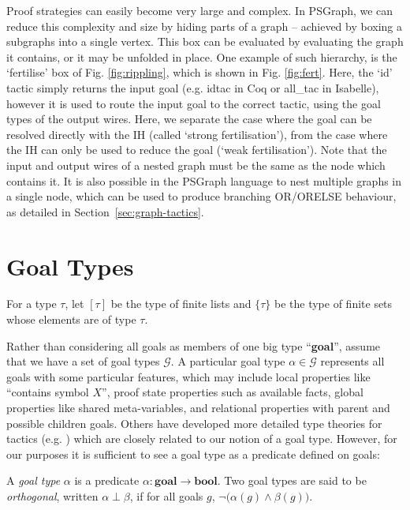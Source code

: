 \documentclass{llncs}
\begin{document}
Proof strategies can easily become very large and complex. In PSGraph, we can
reduce this complexity and size by hiding parts of a graph -- achieved by
boxing a subgraphs into a single vertex. This box can be evaluated by
evaluating the graph it contains, or it may be unfolded in place. One
example of such hierarchy, is the `fertilise' box of Fig. \ref{fig:rippling},
which is shown in Fig. \ref{fig:fert}. Here, the `id' tactic simply returns
the input goal (e.g. \textsf{idtac} in Coq or \textsf{all\_tac} in Isabelle),
however it is used to route the input goal to the correct tactic, using the
goal types of the output wires. Here, we separate the case where the
goal can be resolved directly with the IH (called `strong fertilisation'),
from the case where the IH can only be used to reduce the goal (`weak fertilisation').
Note that the input and output wires of a nested graph must be the same as the
node which contains it. It is also possible in the PSGraph language to nest multiple graphs
in a single node, which can be used to produce branching OR/ORELSE behaviour, as detailed in
Section~\ref{sec:graph-tactics}.

\beforesection
\section{Goal Types}\label{sec:tactic}
\aftersection

For a type $\tau$, let $[\tau]$ be the type of finite lists and $\{ \tau \}$ be the type of finite sets whose elements are of type $\tau$.

Rather than considering all goals as members of one big type ``\textbf{goal}'', assume that we have a 
set of goal types $\mathcal G$. A particular goal type $\alpha \in \mathcal G$ represents all goals with some particular features, which may include local properties like ``contains symbol $X$'', proof state properties 
such as available facts, global properties like shared meta-variables, 
and relational properties with parent and possible children goals. Others have developed more detailed type theories for tactics (e.g. \cite{Stampoulis10}) which are closely related to our notion of a goal type. However, for our purposes it is sufficient to see a goal type as a predicate defined on goals:

\begin{definition}\label{def:goal-type} \rm
A \emph{goal type} $\alpha$ is a predicate $\alpha : \textbf{goal} \to \textbf{bool}$. Two goal types are said to be \emph{orthogonal}, written $\alpha \perp \beta$, if for all goals $g$, $\lnot\big(\alpha(g) \wedge \beta(g)\big)$.
\end{definition} 
\end{document}
